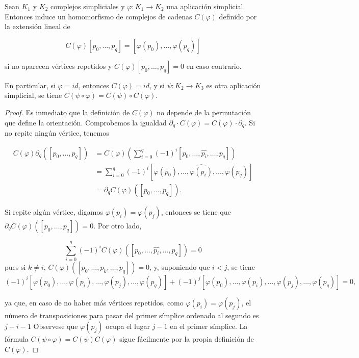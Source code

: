 \begin{proposicion}
	Sean $K_1$ y $K_2$ complejos simpliciales y $\varphi: K_1 \rightarrow K_2$ una aplicación simplicial. Entonces induce un homomorfismo de complejos de cadenas $C(\varphi)$ definido por la extensión lineal de
	
	$$C(\varphi)[p_0, \ldots, p_q] = [\varphi(p_0), \ldots, \varphi(p_q)]$$
	
	si no aparecen vértices repetidos y $C(\varphi)[p_0, \ldots, p_q] = 0$ en caso contrario.
	
	En particular, si $\varphi = id$, entonces $C(\varphi) = id$, y si $\psi: K_2 \longrightarrow K_3$ es otra aplicación simplicial, se tiene $C(\psi \circ \varphi) = C(\psi) \circ C(\varphi)$.
\end{proposicion}
\begin{proof}
	Es inmediato que la definición de $C(\varphi)$ no depende de la permutación que define la orientación. Comprobemos la igualdad $\partial_q \cdot C(\varphi) = C(\varphi) \cdot \partial_q$. Si no repite ningún vértice, tenemos
	
	\begin{align*}
		C(\varphi) \partial_q([p_0, \ldots, p_q]) &= C(\varphi) \left( \sum_{i=0}^q (-1)^i [p_0, \ldots, \hat{p_i}, \ldots, p_q] \right) \\
		&= \sum_{i=0}^q (-1)^i [\varphi(p_0), \ldots, \hat{\varphi(p_i)}, \ldots, \varphi(p_q)] \\
		&= \partial_q C(\varphi)([p_0, \ldots, p_q]).
	\end{align*}
	
	Si repite algún vértice, digamos $\varphi(p_i) = \varphi(p_j)$, entonces se tiene que $\partial_q C(\varphi)([p_0, \ldots, p_q]) = 0$. Por otro lado,
	
	\[
	\sum_{i=0}^q (-1)^i C(\varphi)([p_0, \ldots, \hat{p_i}, \ldots, p_q]) = 0
	\]
	pues si $k \neq i$, $C(\varphi)([p_0, \ldots, \hat{p_k}, \ldots, p_q]) = 0$, y, suponiendo que $i < j$, se tiene
	\[
		(-1)^i [\varphi(p_0), \ldots, \varphi(p_i), \ldots, \varphi(p_j), \ldots, \varphi(p_q)] + (-1)^j [\varphi(p_0), \ldots, \varphi(p_i), \ldots, \varphi(p_j), \ldots, \varphi(p_q)] = 0,
	\]
	
	ya que, en caso de no haber más vértices repetidos, como $\varphi(p_i) = \varphi(p_j)$, el número de transposiciones para pasar del primer símplice ordenado al segundo es \(j-i-1\) Observese que \(\varphi(p_{j})\) ocupa el lugar \(j-1\) en el primer
	símplice. La fórmula \(C(\psi\circ\varphi)=C(\psi)C(\varphi)\) sigue fácilmente por la propia
	definición de \(C(\varphi)\).
\end{proof}



\endinput
